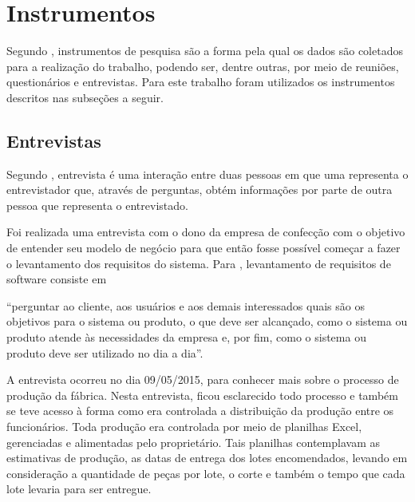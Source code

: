 \section{Instrumentos}

\par Segundo , instrumentos de pesquisa são a
forma pela qual os dados são coletados para a realização do trabalho, podendo ser,
dentre outras, por meio de reuniões, questionários e entrevistas. Para
este trabalho foram utilizados os instrumentos descritos nas subseções a seguir.

\subsection{Entrevistas}
\par Segundo , entrevista é
uma interação entre duas pessoas em que uma representa o entrevistador 
que, através de perguntas, obtém informações por parte de outra pessoa que
representa o entrevistado.

\par Foi realizada uma entrevista com o dono da empresa de confecção com o
objetivo de entender seu modelo de negócio para que então fosse possível começar
a fazer o levantamento dos requisitos do sistema. Para
, levantamento de requisitos de
software consiste em

\begin{citacao}
``perguntar ao cliente, aos usuários e aos demais interessados quais são os
objetivos para o sistema ou produto, o que deve ser alcançado, como o sistema ou
produto atende às necessidades da empresa e, por fim, como o sistema ou produto
deve ser utilizado no dia a dia''.
\end{citacao} 

\par A entrevista ocorreu no dia 09/05/2015, para conhecer mais sobre o processo de 
produção da fábrica. Nesta entrevista, ficou esclarecido todo processo e também
se teve acesso à forma como era controlada a distribuição da produção entre os funcionários. Toda
produção era controlada por meio de planilhas Excel, gerenciadas e alimentadas pelo proprietário. 
Tais planilhas contemplavam as estimativas de produção, as datas de entrega dos
lotes encomendados, levando em consideração a quantidade de peças por lote, o
corte e também o tempo que cada lote levaria para ser entregue.


